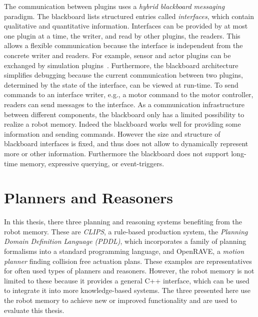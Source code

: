 The communication between plugins uses a \emph{hybrid blackboard messaging}
paradigm. The blackboard lists structured entries called
\emph{interfaces}, which contain qualitative and quantitative
information.  Interfaces can be provided by at most one plugin at a time, the
writer, and read by other plugins, the readers. This allows a flexible
communication because the interface is independent from the concrete
writer and readers.  For example, sensor and actor plugins can be
exchanged by simulation plugins~\cite{Gazsim-Thesis,LLSF-Sim}.
Furthermore, the blackboard architecture simplifies
debugging because the current communication between two plugins,
determined by the state of the interface, can be viewed at
run-time. To send commands to an interface writer, e.g., a motor
command to the motor controller, readers can send messages to the
interface.
As a communication infrastructure between different components, the
blackboard only has a limited possibility to realize a robot memory.
Indeed the blackboard works well for providing some information and sending
commands. However the size
and structure of blackboard interfaces is fixed, and thus does not
allow to dynamically represent more or other information.  Furthermore
the blackboard does not support long-time memory, expressive querying,
or event-triggers.

\section{Planners and Reasoners}
\label{sec:planners}
In this thesis, there three planning and reasoning systems benefiting
from the robot memory. These are \emph{CLIPS}, a
rule-based production system, the \emph{Planning Domain Definition
  Language (PDDL)}, which incorporates a family of planning formalisms
into a standard programming language, and OpenRAVE, a \emph{motion
  planner} finding collision free actuation plans.  These examples are
representatives for often used types of planners and
reasoners. However, the robot memory is not limited to these because
it provides a general C++ interface, which can be used to integrate it
into more knowledge-based systems. The three presented here use the robot memory
to achieve new or improved functionality and are used to evaluate this
thesis.

